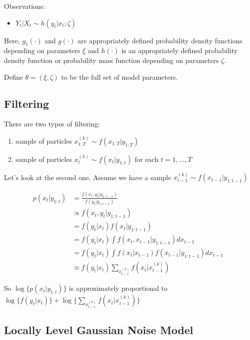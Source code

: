 \documentclass[]{article}
\providecommand{\tightlist}{%
  \setlength{\itemsep}{0pt}\setlength{\parskip}{0pt}}
\begin{document}
Observations:

\begin{itemize}
\item $Y_t \vert X_{t} \sim h(y_t | x_t ; \zeta)$
\end{itemize}

Here, \(g_1(\cdot)\) and \(g(\cdot)\) are appropriately defined
probability density functions depending on parameters \(\xi\) and
\(h(\cdot)\) is an appropriately defined probability density function or
probability mass function depending on parameters \(\zeta\).

Define \(\theta = (\xi, \zeta)\) to be the full set of model parameters.

\subsection{Filtering}\label{filtering}

There are two types of filtering:

\begin{enumerate}
\def\labelenumi{\arabic{enumi}.}
\tightlist
\item
  sample of particles \(x_{1:T}^{(k)} \sim f(x_{1:T} | y_{1:T})\)
\item
  sample of particles \(x_{t}^{(k)} \sim f(x_{t} | y_{1:t})\) for each
  \(t = 1, \ldots, T\)
\end{enumerate}

Let's look at the second one. Assume we have a sample
\(x_{t-1}^{(k)} \sim f(x_{t-1} | y_{1:t-1})\)

\begin{align*}
p(x_{t} | y_{1:t}) &= \frac{f(x_t, y_t | y_{1:t-1})}{f(y_t | y_{1:t-1})} \\
 &\propto f(x_t, y_t | y_{1:t-1}) \\
 &= f(y_t | x_t) f(x_t | y_{1:t-1}) \\
 &= f(y_t | x_t) \int f(x_t, x_{t-1} | y_{1:t-1}) d x_{t-1} \\
 &= f(y_t | x_t) \int f(x_t | x_{t - 1}) f(x_{t-1} | y_{1:{t-1}}) dx_{t-1} \\
 &\approx f(y_t | x_t) \sum_{x_{t-1}^{(k)}} f(x_t | x_{t - 1}^{(k)})
\end{align*}

So \(\log\{p(x_{t} | y_{1:t})\}\) is approximately proportional to
\(\log\{f(y_t | x_t)\} + \log\{\sum_{x_{t-1}^{(k)}} f(x_t | x_{t - 1}^{(k)})\}\)

\subsection{Locally Level Gaussian Noise
Model}\label{locally-level-gaussian-noise-model}
\end{document}
